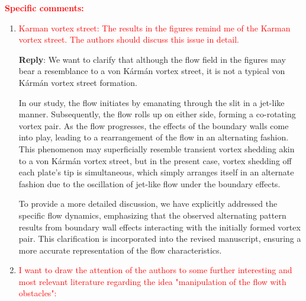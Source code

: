 \documentclass[onecolumn,a4paper,amsmath,amssym,pre]{revtex4}
\begin{document}
				\textcolor{red}{\textbf{Specific comments:}}\\
				
				\begin{enumerate}
					\item \textcolor{red}{Karman vortex street:
						The results in the figures remind me of the Karman vortex street. The authors should discuss this issue in detail.}
					
					\textbf{Reply}: We want to clarify that although the flow field in the figures may bear a resemblance to a von Kármán vortex street, it is not a typical von Kármán vortex street formation.
					
					In our study, the flow initiates by emanating through the slit in a jet-like manner. Subsequently, the flow rolls up on either side, forming a co-rotating vortex pair. As the flow progresses, the effects of the boundary walls come into play, leading to a rearrangement of the flow in an alternating fashion. This phenomenon may superficially resemble transient vortex shedding akin to a von Kármán vortex street, but in the present case, vortex shedding off each plate's tip is simultaneous, which simply arranges itself in an alternate fashion due to the oscillation of jet-like flow under the boundary effects.
					
					To provide a more detailed discussion, we have explicitly addressed the specific flow dynamics, emphasizing that the observed alternating pattern results from boundary wall effects interacting with the initially formed vortex pair. This clarification is incorporated into the revised manuscript, ensuring a more accurate representation of the flow characteristics.
					
					\item \textcolor{red}{I want to draw the attention of the authors to some further interesting and most relevant literature regarding the idea "manipulation of the flow with obstacles":}
					
					\begin{enumerate}
						\color{red}{	\item Manipulation of the flow in channels:
							Massive stabilization of gravity-driven film flows with corrugated side walls.
							
							Kögel, A and Aksel, N,
							Nov 2018 PoF
							30 (11)
							
							\item  Stability of the channel flow - new phenomena in an old problem.
							
}
\end{enumerate}
\end{enumerate}
\end{document}
